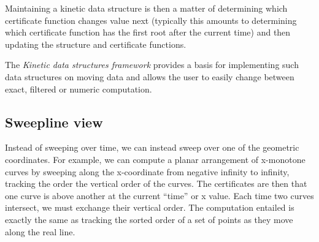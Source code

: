 Maintaining a kinetic data structure is then a matter of determining
which certificate function changes value next (typically this amounts
to determining which certificate function has the first root after the
current time) and then updating the structure and certificate
functions.

The {\em Kinetic data structures framework} provides a basis for
implementing such data structures on moving data and allows the user
to easily change between exact, filtered or numeric computation.

\subsection{Sweepline view}

Instead of sweeping over time, we can instead sweep over one of the
geometric coordinates. For example, we can compute a planar
arrangement of x-monotone curves by sweeping along the x-coordinate
from negative infinity to infinity, tracking the order the vertical
order of the curves. The certificates are then that one curve is above
another at the current ``time'' or x value. Each time two curves
intersect, we must exchange their vertical order. The computation
entailed is exactly the same as tracking the sorted order of a set of
points as they move along the real line.









